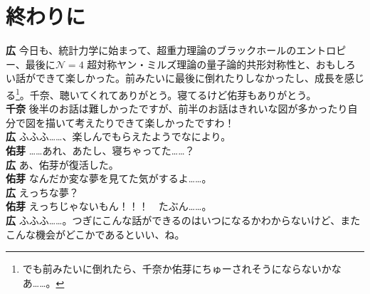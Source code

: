 \documentclass[paper=b5j,fontsize=12Q,jafontsize=12Q,baselineskip=21Q]{jlreq}
\DeclareRobustCommand{\hiron}{\textbf{広 }}
\DeclareRobustCommand{\chinan}{\textbf{千奈 }}
\DeclareRobustCommand{\umen}{\textbf{佑芽 }}
\begin{document}
\section{終わりに}

\hiron 今日も、統計力学に始まって、超重力理論のブラックホールのエントロピー、最後に$\mathcal N=4$ 超対称ヤン・ミルズ理論の量子論的共形対称性と、おもしろい話ができて楽しかった。前みたいに最後に倒れたりしなかったし、成長を感じる\footnote{でも前みたいに倒れたら、千奈か佑芽にちゅーされそうにならないかなあ……。}。千奈、聴いてくれてありがとう。寝てるけど佑芽もありがとう。
\\\chinan 後半のお話は難しかったですが、前半のお話はきれいな図が多かったり自分で図を描いて考えたりできて楽しかったですわ！
\\\hiron ふふふ……、楽しんでもらえたようでなにより。
\\\umen ……あれ、あたし、寝ちゃってた……？
\\\hiron あ、佑芽が復活した。
\\\umen なんだか変な夢を見てた気がするよ……。
\\\hiron えっちな夢？
\\\umen えっちじゃないもん！！！　たぶん……。
\\\hiron ふふふ……。つぎにこんな話ができるのはいつになるかわからないけど、またこんな機会がどこかであるといい、ね。
\end{document}
